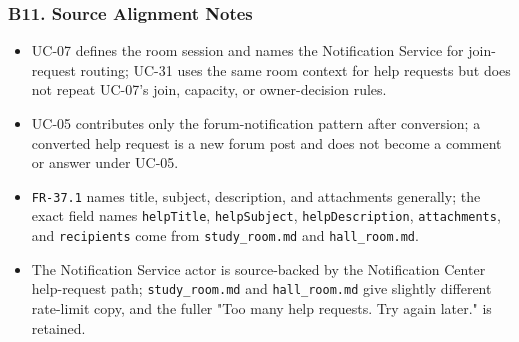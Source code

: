 \documentclass[12pt]{article}
\begin{document}
\hypertarget{sec:b11-source-alignment-notes}{}
\subsubsection*{B11. Source Alignment Notes}
\par\medskip

\begin{itemize}
\item UC-07 defines the room session and names the Notification Service for join-request routing; UC-31 uses the same room context for help requests but does not repeat UC-07's join, capacity, or owner-decision rules.
\item UC-05 contributes only the forum-notification pattern after conversion; a converted help request is a new forum post and does not become a comment or answer under UC-05.
\item \texttt{FR-37.1} names title, subject, description, and attachments generally; the exact field names \texttt{helpTitle}, \texttt{helpSubject}, \texttt{helpDescription}, \texttt{attachments}, and \texttt{recipients} come from \texttt{study\_room.md} and \texttt{hall\_room.md}.
\item The Notification Service actor is source-backed by the Notification Center help-request path; \texttt{study\_room.md} and \texttt{hall\_room.md} give slightly different rate-limit copy, and the fuller "Too many help requests. Try again later." is retained.
\end{itemize}
\par\medskip

\par\medskip
\hypertarget{sec:ui-prototype-specimens}{}
\end{document}
